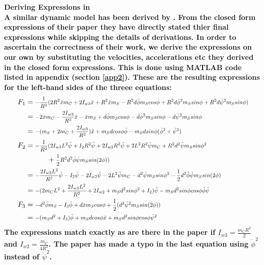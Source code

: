 \documentclass[a4paper,10pt]{article}
\newcommand\scalemath[2]{\scalebox{#1}{\mbox{\ensuremath{\displaystyle #2}}}}
\begin{document}
\bf{Deriving Expressions in \cite{kim2005dynamic}}
\normalfont\\
A similar dynamic model has been derived by \cite{kim2005dynamic}. From the closed form expressions of their paper they
have directly stated thier final expressions while skipping the details of derivations. In order to ascertain
the correctness of their work, we derive the expressions on our own by substituting the velocities, accelerations etc
they derived in the closed form expressions. This is done using MATLAB code listed in appendix (section \ref{app2}).
These are the resulting expressions for the left-hand sides of the threee equations:
\begin{align}
 F_1 &= \scalemath{0.8}{-\frac{1}{R^2}(2R^2\ddot{x}m_C + 2I_{w3}\ddot{x} + R^2\ddot{x}m_S - R^2d\ddot{\phi}m_Scos\phi + R^2d\dot{\phi}^2m_Ssin\phi + R^2d\dot{\psi}^2m_Ssin\phi)} \nonumber \\
     &= \scalemath{0.8}{-2\ddot{x}m_C - \frac{2I_{w3}}{R^2}\ddot{x} - \ddot{x}m_S + d\ddot{\phi}m_Scos\phi - d\dot{\phi}^2m_Ssin\phi - d\dot{\psi}^2m_Ssin\phi} \nonumber \\
     &= \scalemath{0.8}{-(m_S + 2m_C + \frac{2I_{w3}}{R^2})\ddot{x} + m_Sdcos\phi\ddot{\phi} - m_Sdsin\phi(\dot{\phi}^2 + \dot{\psi}^2)} \nonumber \\
 F_2 &= \scalemath{0.8}{-\frac{1}{R^2}(2I_{w3}L^2\ddot{\psi} + I_2R^2\ddot{\psi} + 2I_{w2}R^2\ddot{\psi} + 2L^2R^2\ddot{\psi}m_C + R^2d^2\ddot{\psi}m_Ssin\phi^2} \nonumber \\ 
         & \hskip 3em + \scalemath{0.8}{\frac{1}{2}R^2d^2\dot{\phi}\dot{\psi}m_Ssin(2\phi))} \nonumber \\
     &= \scalemath{0.8}{-\frac{2I_{w3}L^2}{R^2}\ddot{\psi} - I_2\ddot{\psi} - 2I_{w2}\ddot{\psi} - 2L^2\ddot{\psi}m_C - d^2\ddot{\psi}m_Ssin\phi^2 - \frac{1}{2}d^2\dot{\phi}\dot{\psi}m_Ssin(2\phi)} \nonumber \\
     &= \scalemath{0.8}{-(2m_CL^2 +\frac{2I_{w3}L^2}{R^2} + 2I_{w2} + m_Sd^2sin\phi^2 + I_2 )\ddot{\psi} - m_Sd^2sin\phi cos\phi\dot{\phi}\dot{\psi}} \nonumber \\
 F_3 &= \scalemath{0.8}{-d^2\ddot{\phi}m_S - I_3\ddot{\phi} + d\ddot{x}m_Scos\phi + \frac{1}{2}(d^2\dot{\psi}^2m_Ssin(2\phi))} \nonumber \\
     &= \scalemath{0.8}{-(m_Sd^2 + I_3)\ddot{\phi} + m_Sdcos\phi\ddot{x} + m_Sd^2sin\phi cos\phi\dot{\psi}^2} \nonumber  
\end{align}
The expressions match exactly as are there in the paper if $I_{w3} = \frac{m_CR^2}{2}$ and $I_{w2} = \frac{m_C}{4R^2}$.
The paper has made a typo in the last equation using $\dot{\phi}^2$ instead of $\dot{\psi}^2$. 
\end{document}
